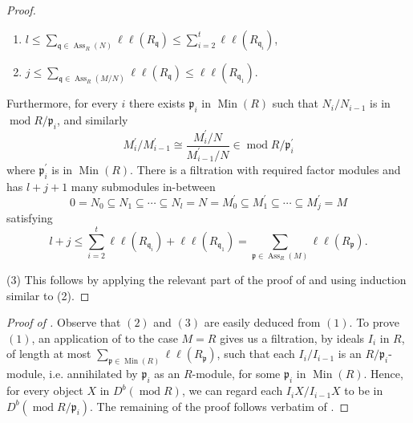 \documentclass[11pt]{amsart}
\theoremstyle{plain}
\theoremstyle{definition}
\numberwithin{equation}{section}
\numberwithin{theorem}{section}
\begin{document}
\begin{proof}
\begin{enumerate}
        \item $l\leq \sum_{\mathfrak{q}\in \operatorname{Ass}_R(N)} \ell\ell(R_{\mathfrak{q}}) \leq \sum_{i=2}^t\ell\ell(R_{\mathfrak{q}_i})$,
        \item $j\leq \sum_{\mathfrak{q} \in \operatorname{Ass}_R(M/N)}\ell\ell(R_{\mathfrak{q}})\leq \ell\ell(R_{\mathfrak{q}_1})$.
    \end{enumerate}
    Furthermore, for every $i$ there exists $\mathfrak{p}_i$ in $\operatorname{Min}(R)$ such that $N_i/N_{i-1}$ is in $\operatorname{mod}R/\mathfrak{p}_i$, and similarly 
    \begin{displaymath}
        M^\prime_i/M^\prime_{i-1}\cong \dfrac{M_i^\prime/N}{M^\prime_{i-1}/N}\in \operatorname{mod}R/\mathfrak{p}_i^\prime
    \end{displaymath}
    where $\mathfrak{p}^\prime_i$ is in $\operatorname{Min}(R)$. There is a filtration with required factor modules and has $l+j+1$ many submodules in-between
    \begin{displaymath}
        0=N_0\subseteq N_1\subseteq \cdots \subseteq N_l=N=M^\prime_0\subseteq M^\prime_1\subseteq \cdots\subseteq M^\prime_j=M    
    \end{displaymath}
    satisfying
    \begin{displaymath}
        l+j\leq \sum_{i=2}^t\ell\ell(R_{\mathfrak{q}_i})+\ell\ell(R_{\mathfrak{q}_1})=\sum_{\mathfrak{p}\in \operatorname{Ass}_R(M)} \ell\ell(R_{\mathfrak{p}}).
    \end{displaymath}   

    (3) This follows by applying the relevant part of the proof of \cite[Theorem 5.1]{Kawasaki/Nakumara/Shimada:2019} and using induction similar to (2).   
\end{proof}

\begin{proof}[Proof of ]
     Observe that $(2)$ and $(3)$ are easily deduced from $(1)$. To prove $(1)$, an application of  to the case $M=R$ gives us a filtration, by ideals $I_i$ in $R$, of length at most $\sum_{\mathfrak{p} \in \operatorname{Min}(R)} \ell\ell(R_\mathfrak{p})$, such that each $I_i/I_{i-1}$ is an $R/\mathfrak{p}_i$-module, i.e. annihilated by $\mathfrak{p}_i$ as an $R$-module, for some $\mathfrak{p}_i$ in $\operatorname{Min}(R)$. Hence, for every object $X$ in $D^b(\operatorname{mod}R)$, we can regard each $I_i X/I_{i-1} X$ to be in $D^b( \operatorname{mod} R/\mathfrak{p}_i)$. The remaining of the proof follows verbatim of \cite[Proposition 3.9]{Aihara/Takahashi:2015}.
\end{proof}
\end{document}
